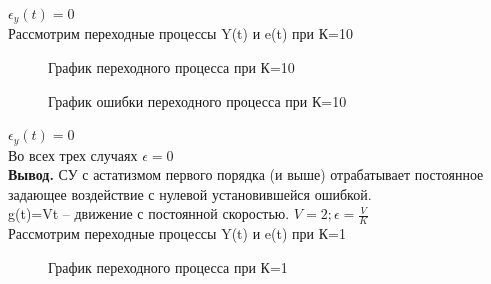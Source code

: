 \documentclass[a4paper, 11pt]{article}
\begin{document}
$\epsilon_y(t)=0$\\

Рассмотрим переходные процессы Y(t) и e(t) при К=10

\begin{figure}[h!]
    \caption{График переходного процесса при К=10}
    \label{two}
\end{figure}

\newpage

\begin{figure}[h!]
    \caption{График ошибки переходного процесса при К=10}
    \label{tree}
\end{figure}

$\epsilon_y(t)=0$\\

Во всех трех случаях $\epsilon = 0$\\

\textbf{Вывод.} СУ с астатизмом первого порядка (и выше) отрабатывает постоянное задающее воздействие с нулевой установившейся ошибкой.\\


g(t)=Vt – движение с постоянной скоростью.  $V = 2; \epsilon=\frac{V}{K}$\\

Рассмотрим переходные процессы Y(t) и e(t) при К=1

\begin{figure}[h!]
    \caption{График переходного процесса при К=1}
    \label{two}
\end{figure}
\end{document}
